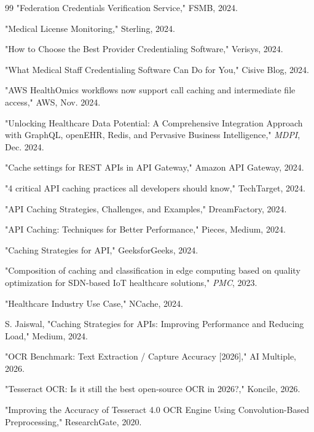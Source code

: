 \documentclass[conference]{IEEEtran}
\begin{document}
\begin{thebibliography}{99}
"Federation Credentials Verification Service," FSMB, 2024.

"Medical License Monitoring," Sterling, 2024.

"How to Choose the Best Provider Credentialing Software," Verisys, 2024.

"What Medical Staff Credentialing Software Can Do for You," Cisive Blog, 2024.

"AWS HealthOmics workflows now support call caching and intermediate file access," AWS, Nov. 2024.

"Unlocking Healthcare Data Potential: A Comprehensive Integration Approach with GraphQL, openEHR, Redis, and Pervasive Business Intelligence," \textit{MDPI}, Dec. 2024.

"Cache settings for REST APIs in API Gateway," Amazon API Gateway, 2024.

"4 critical API caching practices all developers should know," TechTarget, 2024.

"API Caching Strategies, Challenges, and Examples," DreamFactory, 2024.

"API Caching: Techniques for Better Performance," Pieces, Medium, 2024.

"Caching Strategies for API," GeeksforGeeks, 2024.

"Composition of caching and classification in edge computing based on quality optimization for SDN-based IoT healthcare solutions," \textit{PMC}, 2023.

"Healthcare Industry Use Case," NCache, 2024.

S. Jaiswal, "Caching Strategies for APIs: Improving Performance and Reducing Load," Medium, 2024.

"OCR Benchmark: Text Extraction / Capture Accuracy [2026]," AI Multiple, 2026.

"Tesseract OCR: Is it still the best open-source OCR in 2026?," Koncile, 2026.

"Improving the Accuracy of Tesseract 4.0 OCR Engine Using Convolution-Based Preprocessing," ResearchGate, 2020.


\end{thebibliography}
\end{document}
